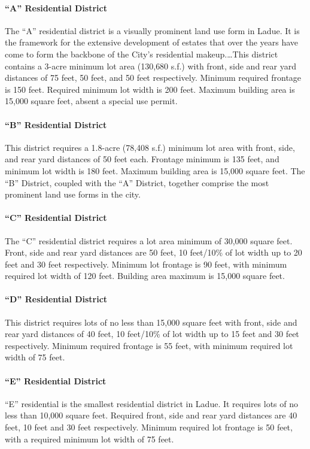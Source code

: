 
\paragraph{``A'' Residential District} The ``A'' residential district is a
visually prominent land use form in Ladue. It is the framework for the extensive
development of estates that over the years have come to form the backbone of the
City's residential makeup.\ldots This district contains a 3-acre minimum lot
area (130,680 s.f.) with front, side and rear yard distances of 75 feet, 50
feet, and 50 feet respectively. Minimum required frontage is 150 feet. Required
minimum lot width is 200 feet. Maximum building area is 15,000 square feet,
absent a special use permit.

\paragraph{``B'' Residential District} This district requires a 1.8-acre (78,408
s.f.) minimum lot area with front, side, and rear yard distances of 50 feet
each. Frontage minimum is 135 feet, and minimum lot width is 180 feet. Maximum
building area is 15,000 square feet. The ``B'' District, coupled with the ``A''
District, together comprise the most prominent land use forms in the city.

\paragraph{``C'' Residential District} The ``C'' residential district requires
a lot area minimum of 30,000 square feet. Front, side and rear yard distances
are 50 feet, 10 feet/10\% of lot width up to 20 feet and 30 feet respectively.
Minimum lot frontage is 90 feet, with minimum required lot width of 120 feet.
Building area maximum is 15,000 square feet.

\paragraph{``D'' Residential District} This district requires lots of no less
than 15,000 square feet with front, side and rear yard distances of 40 feet, 10
feet/10\% of lot width up to 15 feet and 30 feet respectively. Minimum required
frontage is 55 feet, with minimum required lot width of 75 feet.

\paragraph{``E'' Residential District} ``E'' residential is the smallest
residential district in Ladue. It requires lots of no less than 10,000 square
feet. Required front, side and rear yard distances are 40 feet, 10 feet and 30
feet respectively. Minimum required lot frontage is 50 feet, with a required
minimum lot width of 75 feet. 

